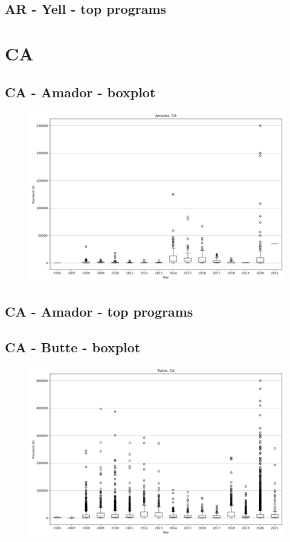 \subsection*{AR - Yell - top programs}

\newpage
\section*{CA}
\subsection*{CA - Amador - boxplot}
\begin{figure}[h]
\centering
\includegraphics[width=7in]{../output/boxplots/counties/Amador-CA_boxplot.png}
\end{figure}


\subsection*{CA - Amador - top programs}

\newpage
\subsection*{CA - Butte - boxplot}
\begin{figure}[h]
\centering
\includegraphics[width=7in]{../output/boxplots/counties/Butte-CA_boxplot.png}
\end{figure}


